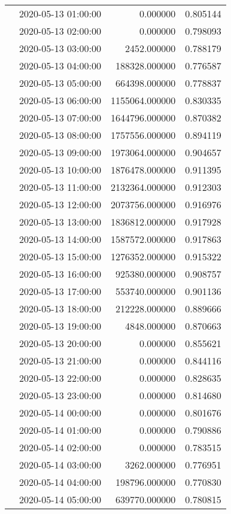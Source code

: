 \begin{tabular}{llrr}
 & 2020-05-13 01:00:00 & 0.000000 & 0.805144 \\
 & 2020-05-13 02:00:00 & 0.000000 & 0.798093 \\
 & 2020-05-13 03:00:00 & 2452.000000 & 0.788179 \\
 & 2020-05-13 04:00:00 & 188328.000000 & 0.776587 \\
 & 2020-05-13 05:00:00 & 664398.000000 & 0.778837 \\
 & 2020-05-13 06:00:00 & 1155064.000000 & 0.830335 \\
 & 2020-05-13 07:00:00 & 1644796.000000 & 0.870382 \\
 & 2020-05-13 08:00:00 & 1757556.000000 & 0.894119 \\
 & 2020-05-13 09:00:00 & 1973064.000000 & 0.904657 \\
 & 2020-05-13 10:00:00 & 1876478.000000 & 0.911395 \\
 & 2020-05-13 11:00:00 & 2132364.000000 & 0.912303 \\
 & 2020-05-13 12:00:00 & 2073756.000000 & 0.916976 \\
 & 2020-05-13 13:00:00 & 1836812.000000 & 0.917928 \\
 & 2020-05-13 14:00:00 & 1587572.000000 & 0.917863 \\
 & 2020-05-13 15:00:00 & 1276352.000000 & 0.915322 \\
 & 2020-05-13 16:00:00 & 925380.000000 & 0.908757 \\
 & 2020-05-13 17:00:00 & 553740.000000 & 0.901136 \\
 & 2020-05-13 18:00:00 & 212228.000000 & 0.889666 \\
 & 2020-05-13 19:00:00 & 4848.000000 & 0.870663 \\
 & 2020-05-13 20:00:00 & 0.000000 & 0.855621 \\
 & 2020-05-13 21:00:00 & 0.000000 & 0.844116 \\
 & 2020-05-13 22:00:00 & 0.000000 & 0.828635 \\
 & 2020-05-13 23:00:00 & 0.000000 & 0.814680 \\
 & 2020-05-14 00:00:00 & 0.000000 & 0.801676 \\
 & 2020-05-14 01:00:00 & 0.000000 & 0.790886 \\
 & 2020-05-14 02:00:00 & 0.000000 & 0.783515 \\
 & 2020-05-14 03:00:00 & 3262.000000 & 0.776951 \\
 & 2020-05-14 04:00:00 & 198796.000000 & 0.770830 \\
 & 2020-05-14 05:00:00 & 639770.000000 & 0.780815 \\

\end{tabular}
